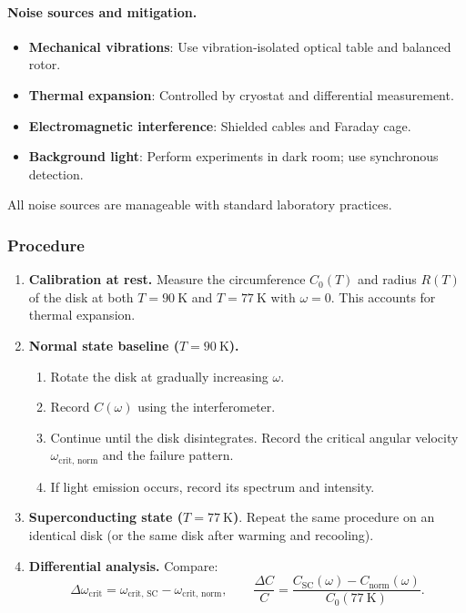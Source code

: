 \documentclass[12pt,a4paper]{article}
\begin{document}
\paragraph{Noise sources and mitigation.}
\begin{itemize}
	\item \textbf{Mechanical vibrations}: Use vibration‑isolated optical table and balanced rotor.
	\item \textbf{Thermal expansion}: Controlled by cryostat and differential measurement.
	\item \textbf{Electromagnetic interference}: Shielded cables and Faraday cage.
	\item \textbf{Background light}: Perform experiments in dark room; use synchronous detection.
\end{itemize}
All noise sources are manageable with standard laboratory practices.

\subsubsection{Procedure}

\begin{enumerate}
	\item \textbf{Calibration at rest.} Measure the circumference \(C_0(T)\) and radius \(R(T)\) of the disk at both \(T = 90\ \text{K}\) and \(T = 77\ \text{K}\) with \(\omega = 0\). This accounts for thermal expansion.
	
	\item \textbf{Normal state baseline (\(T = 90\ \text{K}\)).} 
	\begin{enumerate}
		\item Rotate the disk at gradually increasing \(\omega\).
		\item Record \(C(\omega)\) using the interferometer.
		\item Continue until the disk disintegrates. Record the critical angular velocity \(\omega_{\text{crit, norm}}\) and the failure pattern.
		\item If light emission occurs, record its spectrum and intensity.
	\end{enumerate}
	
	\item \textbf{Superconducting state (\(T = 77\ \text{K}\))}. Repeat the same procedure on an identical disk (or the same disk after warming and recooling).
	
	\item \textbf{Differential analysis.} Compare:
	\[
	\Delta \omega_{\text{crit}} = \omega_{\text{crit, SC}} - \omega_{\text{crit, norm}},\qquad
	\frac{\Delta C}{C} = \frac{C_{\text{SC}}(\omega) - C_{\text{norm}}(\omega)}{C_0(77\ \text{K})}.
	\]
\end{enumerate}
\end{document}

